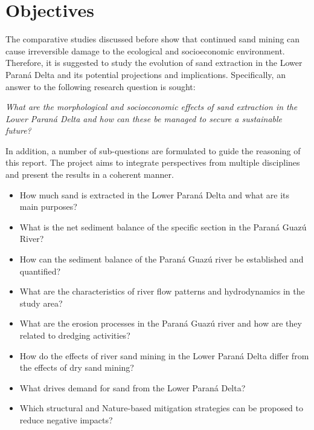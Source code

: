 \section{Objectives}

 
The comparative studies discussed before show that continued sand mining can cause irreversible damage to the ecological and socioeconomic environment.
Therefore, it is suggested to study the evolution of sand extraction in the Lower Paraná Delta and its potential projections and implications. Specifically, an answer to the following research question is sought:

\textit{What are the morphological and socioeconomic effects of sand extraction in the Lower Paraná Delta and how can these be managed to secure a sustainable future?}

In addition, a number of sub-questions are formulated to guide the reasoning of this report. The project aims to integrate perspectives from multiple disciplines and present the results in a coherent manner.

\begin{itemize} 
    \item How much sand is extracted in the Lower Paraná Delta and what are its main purposes?
    \item What is the net sediment balance of the specific section in the Paraná Guazú River?
    \item How can the sediment balance of the Paraná Guazú river be established and quantified?
    \item What are the characteristics of river flow patterns and hydrodynamics in the study area?
    \item What are the erosion processes in the Paraná Guazú river and how are they related to dredging activities?
    \item How do the effects of river sand mining in the Lower Paraná Delta differ from the effects of dry sand mining?
    \item What drives demand for sand from the Lower Paraná Delta?
    \item Which structural and Nature-based mitigation strategies can be proposed to reduce negative impacts?
\end{itemize}

